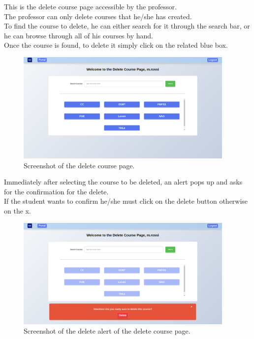 This is the delete course page accessible by the professor.\\
The professor can only delete courses that he/she has created.\\
To find the course to delete, he can either search for it through the search bar, or he can browse through all of his courses by hand.\\
Once the course is found, to delete it simply click on the related blue box.\\

\begin{figure}[H]
    \centering
     \includegraphics[width=0.95\textwidth]{img/user_manual/professor/delete_course.png}
    \caption{\label{fig:professor-delete-course-1} Screenshot of the delete course page.}
\end{figure}

Immediately after selecting the course to be deleted, an alert pops up and asks for the confirmation for the delete.\\
If the student wants to confirm he/she must click on the delete button otherwise on the x.\\

\begin{figure}[H]
    \centering
     \includegraphics[width=0.95\textwidth]{img/user_manual/professor/delete-course-delete-alert.png}
    \caption{\label{fig:professor-delete-course-2} Screenshot of the delete alert of the delete course page.}
\end{figure}

